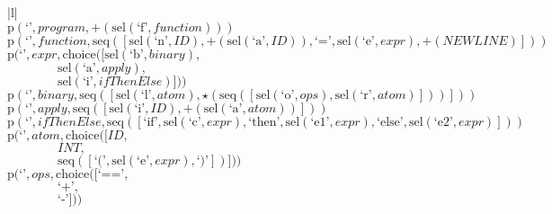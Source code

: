 \footnotesize\begin{center}\begin{tabular}{|l|}\hline
{}
\\\hline
$\mathrm{p}(\text{`'},\mathit{program},\plus \left(\mathrm{sel}\left(\text{`f'},\mathit{function}\right)\right))$	\\
$\mathrm{p}(\text{`'},\mathit{function},\mathrm{seq}\left(\left[\mathrm{sel}\left(\text{`n'},\mathit{ID}\right), \plus \left(\mathrm{sel}\left(\text{`a'},\mathit{ID}\right)\right), \text{`='}, \mathrm{sel}\left(\text{`e'},\mathit{expr}\right), \plus \left(\mathit{NEWLINE}\right)\right]\right))$	\\
$\mathrm{p}(\text{`'},\mathit{expr},\mathrm{choice}([\mathrm{sel}\left(\text{`b'},\mathit{binary}\right),$\\$\qquad\qquad\mathrm{sel}\left(\text{`a'},\mathit{apply}\right),$\\$\qquad\qquad\mathrm{sel}\left(\text{`i'},\mathit{ifThenElse}\right)]))$	\\
$\mathrm{p}(\text{`'},\mathit{binary},\mathrm{seq}\left(\left[\mathrm{sel}\left(\text{`l'},\mathit{atom}\right), \star \left(\mathrm{seq}\left(\left[\mathrm{sel}\left(\text{`o'},\mathit{ops}\right), \mathrm{sel}\left(\text{`r'},\mathit{atom}\right)\right]\right)\right)\right]\right))$	\\
$\mathrm{p}(\text{`'},\mathit{apply},\mathrm{seq}\left(\left[\mathrm{sel}\left(\text{`i'},\mathit{ID}\right), \plus \left(\mathrm{sel}\left(\text{`a'},\mathit{atom}\right)\right)\right]\right))$	\\
$\mathrm{p}(\text{`'},\mathit{ifThenElse},\mathrm{seq}\left(\left[\text{`if'}, \mathrm{sel}\left(\text{`c'},\mathit{expr}\right), \text{`then'}, \mathrm{sel}\left(\text{`e1'},\mathit{expr}\right), \text{`else'}, \mathrm{sel}\left(\text{`e2'},\mathit{expr}\right)\right]\right))$	\\
$\mathrm{p}(\text{`'},\mathit{atom},\mathrm{choice}([\mathit{ID},$\\$\qquad\qquad\mathit{INT},$\\$\qquad\qquad\mathrm{seq}\left(\left[\text{`('}, \mathrm{sel}\left(\text{`e'},\mathit{expr}\right), \text{`)'}\right]\right)]))$	\\
$\mathrm{p}(\text{`'},\mathit{ops},\mathrm{choice}([\text{`=='},$\\$\qquad\qquad\text{`+'},$\\$\qquad\qquad\text{`-'}]))$	\\
\hline\end{tabular}\end{center}

